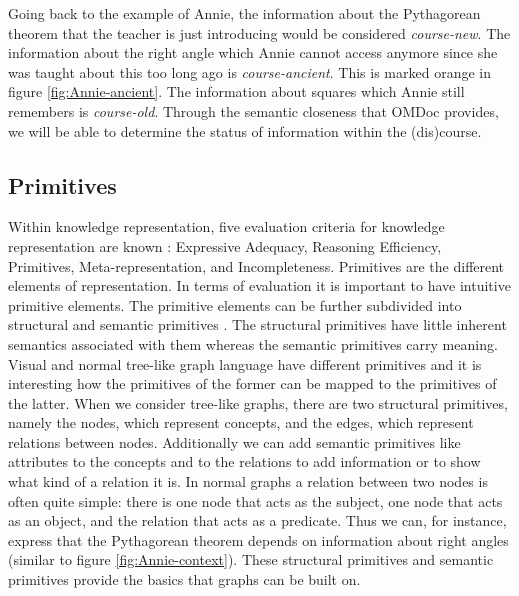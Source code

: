 \documentclass[twoside, 12pt]{article}
\begin{document}
Going back to the example of Annie, the information about the Pythagorean theorem that the teacher is just introducing would be considered \textit{course-new}. The information about the right angle which Annie cannot access anymore since she was taught about this too long ago is \textit{course-ancient}. This is marked orange in figure \ref{fig:Annie-ancient}. The information about squares which Annie still remembers is \textit{course-old}. Through the semantic closeness that OMDoc provides, we will be able to determine the status of information within the (dis)course.  \\

\subsection{Primitives}
\label{sec:primitives}

Within knowledge representation, five evaluation criteria for knowledge representation are known \cite{Kohlhase:Complog:base}: Expressive Adequacy, Reasoning Efficiency, Primitives, Meta-representation, and Incompleteness. Primitives are the different elements of representation. In terms of evaluation it is important to have intuitive primitive elements. The primitive elements can be further subdivided into structural and semantic primitives \cite{DBLP:dblp_conf/acl/Salveter80}. The structural primitives have little inherent semantics associated with them whereas the semantic primitives carry meaning.\\

Visual and normal tree-like graph language have different primitives and it is interesting how the primitives of the former can be mapped to the primitives of the latter. When we consider tree-like graphs, there are two structural primitives, namely the nodes, which represent concepts, and the edges, which represent relations between nodes. Additionally we can add semantic primitives like attributes to the concepts and to the relations to add information or to show what kind of a relation it is. In normal graphs a relation between two nodes is often quite simple: there is one node that acts as the subject, one node that acts as an object, and the relation that acts as a predicate. Thus we can, for instance, express that the Pythagorean theorem depends on information about right angles (similar to figure \ref{fig:Annie-context}). These structural primitives and semantic primitives provide the basics that graphs can be built on.\\
\end{document}
